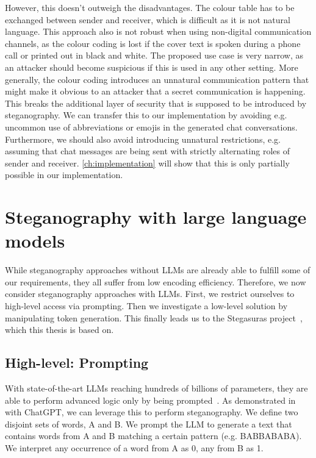 However, this doesn't outweigh the disadvantages. The colour table has to be exchanged between sender and receiver, which is difficult as it is not natural language. This approach also is not robust when using non-digital communication channels, as the colour coding is lost if the cover text is spoken during a phone call or printed out in black and white. The proposed use case is very narrow, as an attacker should become suspicious if this is used in any other setting. More generally, the colour coding introduces an unnatural communication pattern that might make it obvious to an attacker that a secret communication is happening. This breaks the additional layer of security that is supposed to be introduced by steganography. We can transfer this to our implementation by avoiding e.g. uncommon use of abbreviations or emojis in the generated chat conversations. Furthermore, we should also avoid introducing unnatural restrictions, e.g. assuming that chat messages are being sent with strictly alternating roles of sender and receiver. \cref{ch:implementation} will show that this is only partially possible in our implementation.

\section{Steganography with large language models}
\label{sec:steganographyWithLLMs}
While steganography approaches without \glspl{LLM} are already able to fulfill some of our requirements, they all suffer from low encoding efficiency. Therefore, we now consider steganography approaches with \glspl{LLM}. First, we restrict ourselves to high-level access via prompting. Then we investigate a low-level solution by manipulating token generation. This finally leads us to the Stegasuras project~\cite{zieglerNeuralLinguisticSteganography2019}, which this thesis is based on.

\subsection{High-level: Prompting}
\label{sec:highLevelPrompting}
With state-of-the-art \glspl{LLM} reaching hundreds of billions of parameters, they are able to perform advanced logic only by being prompted~\cite{hossainLLMProSAnalyzingLarge2025}. As demonstrated in~\cite{steinebachNaturalLanguageSteganography2024} with ChatGPT, we can leverage this to perform steganography. We define two disjoint sets of words, A and B. We prompt the \gls{LLM} to generate a text that contains words from A and B matching a certain pattern (e.g. BABBABABA). We interpret any occurrence of a word from A as 0, any from B as 1.

